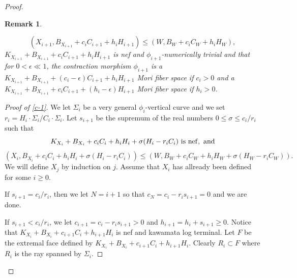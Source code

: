 \documentclass[12pt]{amsart}
\theoremstyle{plain}
\newtheorem{remark}[theorem]{Remark}
\begin{document}
\begin{proof}
\begin{remark}
\begin{enumerate}
\begin{equation}\label{e-a}
(X_{i+1},B_{X_{i+1}}+c_iC_{i+1}+h_iH_{i+1})\leq (W,B_{W}+c_iC_W+h_iH_W),
\end{equation}
$K_{X_{i+1}}+B_{X_{i+1}}+c_iC_{i+1}+h_iH_{i+1}$ is nef and 
$\phi _{i+1}$-numerically trivial and that for $0<\epsilon \ll 1$, the 
contraction morphism $\phi _{i+1}$ is a $K_{X_{i+1}}+B_{X_{i+1}}+
(c_i-\epsilon)C_{i+1}+h_iH_{i+1}$ Mori fiber space if $c_i>0$ and a 
$K_{X_{i+1}}+B_{X_{i+1}}+
c_iC_{i+1}+(h_i-\epsilon)H_{i+1}$ Mori fiber space if $h_i>0$.
\end{enumerate}\end{remark}
\begin{proof}[Proof of \ref{c-1}] We let $\Sigma _i$ be a very general $\phi_i$-vertical curve and we set $r_i=
H_i\cdot \Sigma _i/C_i\cdot \Sigma _i$.
Let $s_{i+1}$ be the supremum of the real numbers $0\leq \sigma \leq c_i/r_i$
such that \begin{equation}\label{e-b}K_{X_i}+B_{X_i}+c_iC_i+h_iH_i+\sigma(H_i-r_iC_i)\ {\rm is\ nef,\ and}\end{equation}
\begin{equation}\label{e-c} (X_i,B_{X_i}+c_iC_i+h_iH_i+\sigma(H_i-r_iC_i))\leq (W,B_W+c_iC_W+h_iH_W+\sigma(H_W-r_iC_W)).\end{equation}
We will define $X_j$ by induction on $j$. Assume that $X_i$ has allready been defined for some $i\geq 0$. 

If $s_{i+1}=c_i/r_i$, then we let $N=i+1$ so that $c_N=c_i-r_is_{i+1}=0$ and 
we are done.

If $s_{i+1}<c_i/r_i$, we let  $c_{i+1}=c_i-r_is_{i+1}>0$ and $h_{i+1}=h_i+s_{i+1}\geq 0$.
Notice that $K_{X_i}+B_{X_i}+c_{i+1}C_{i}+h_{i+1}H_{i}$ is nef
and kawamata log terminal.
Let $F$ be the extremal face defined by $K_{X_i}+B_{X_i}+c_{i+1}C_{i}+h_{i+1}H_{i}$. Clearly $R_i\subset F$ where $R_i$ is the ray spanned by $\Sigma _i$.


\end{proof}
\end{proof}
\end{document}
